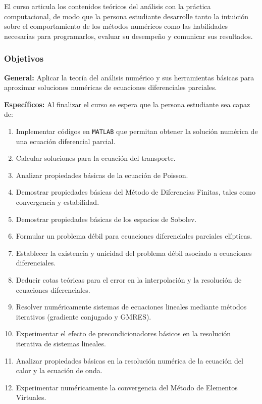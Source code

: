 \begin{refsection}
El curso articula los contenidos teóricos del análisis con la práctica computacional, de modo que la persona estudiante desarrolle tanto la intuición sobre el comportamiento de los métodos numéricos como las habilidades necesarias para programarlos, evaluar su desempeño y comunicar sus resultados.

\subsubsection*{Objetivos}

\textbf{General:} Aplicar la teoría del análisis numérico y sus herramientas básicas para aproximar soluciones numéricas de ecuaciones diferenciales parciales.

\textbf{Específicos:} Al finalizar el curso se espera que la persona estudiante sea capaz de:

\begin{enumerate}
\item Implementar códigos en \texttt{MATLAB} que permitan obtener la solución numérica de una ecuación diferencial parcial.
\item Calcular soluciones para la ecuación del transporte.
\item Analizar propiedades básicas de la ecuación de Poisson.
\item Demostrar propiedades básicas del Método de Diferencias Finitas, tales como convergencia y estabilidad.
\item Demostrar propiedades básicas de los espacios de Sobolev.
\item Formular un problema débil para ecuaciones diferenciales parciales elípticas.
\item Establecer la existencia y unicidad del problema débil asociado a ecuaciones diferenciales.
\item Deducir cotas teóricas para el error en la interpolación y la resolución de ecuaciones diferenciales.
\item Resolver numéricamente sistemas de ecuaciones lineales mediante métodos iterativos (gradiente conjugado y GMRES).
\item Experimentar el efecto de precondicionadores básicos en la resolución iterativa de sistemas lineales.
\item Analizar propiedades básicas en la resolución numérica de la ecuación del calor y la ecuación de onda.
\item Experimentar numéricamente la convergencia del Método de Elementos Virtuales.
\end{enumerate}


\end{refsection}
